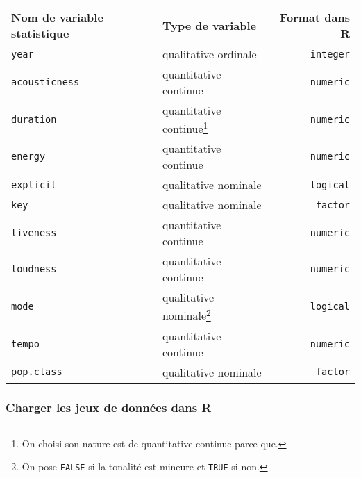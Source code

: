 \documentclass[
  12pt,
]{article}
\begin{document}
\begin{longtable}[]{@{}llr@{}}
\toprule
Nom de variable statistique & Type de variable & Format dans R \\
\midrule
\endhead
\texttt{year} & qualitative ordinale & \texttt{integer} \\
\texttt{acousticness} & quantitative continue & \texttt{numeric} \\
\texttt{duration} & quantitative continue\footnote{On choisi son nature
  est de quantitative continue parce que.} & \texttt{numeric} \\
\texttt{energy} & quantitative continue & \texttt{numeric} \\
\texttt{explicit} & qualitative nominale & \texttt{logical} \\
\texttt{key} & qualitative nominale & \texttt{factor} \\
\texttt{liveness} & quantitative continue & \texttt{numeric} \\
\texttt{loudness} & quantitative continue & \texttt{numeric} \\
\texttt{mode} & qualitative nominale\footnote{On pose \texttt{FALSE} si
  la tonalité est mineure et \texttt{TRUE} si non.} &
\texttt{logical} \\
\texttt{tempo} & quantitative continue & \texttt{numeric} \\
\texttt{pop.class} & qualitative nominale & \texttt{factor} \\
\bottomrule
\end{longtable}

\hypertarget{charger-les-jeux-de-donnuxe9es-dans-r}{%
\subsubsection{Charger les jeux de données dans
R}\label{charger-les-jeux-de-donnuxe9es-dans-r}}
\end{document}
